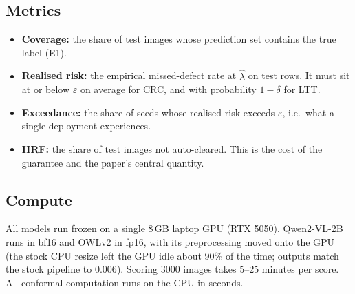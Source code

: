 \subsection{Metrics}

\begin{itemize}
  \item \textbf{Coverage:} the share of test images whose prediction set
  contains the true label (E1).
  \item \textbf{Realised risk:} the empirical missed-defect rate at
  $\hat\lambda$ on test rows. It must sit at or below $\varepsilon$ on
  average for CRC, and with probability $1-\delta$ for LTT.
  \item \textbf{Exceedance:} the share of seeds whose realised risk
  exceeds $\varepsilon$, i.e.\ what a single deployment experiences.
  \item \textbf{HRF:} the share of test images not auto-cleared. This is
  the cost of the guarantee and the paper's central quantity.
\end{itemize}

\subsection{Compute}

All models run frozen on a single 8\,GB laptop GPU (RTX 5050). Qwen2-VL-2B
runs in bf16 and OWLv2 in fp16, with its preprocessing moved onto the GPU
(the stock CPU resize left the GPU idle about 90\% of the time; outputs
match the stock pipeline to $0.006$). Scoring 3000 images takes 5--25
minutes per score. All conformal computation runs on the CPU in seconds.
